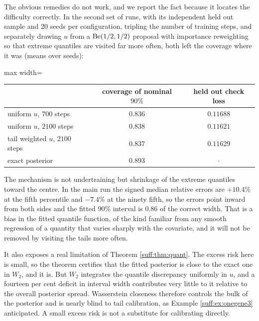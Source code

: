 The obvious remedies do not work, and we report the fact because it locates the difficulty
correctly. In the second set of runs, with its independent held out sample and $20$ seeds per
configuration, tripling the number of training steps, and separately drawing $u$ from a
$\mathrm{Be}(1/2,1/2)$ proposal with importance reweighting so that extreme quantiles are visited far
more often, both left the coverage where it was (means over seeds):

\begin{center}
\begin{adjustbox}{max width=\textwidth}
\begin{tabular}{lcc}
\toprule
& coverage of nominal $90\%$ & held out check loss \\
\midrule
uniform $u$, $700$ steps            & $0.836$ & $0.11688$ \\
uniform $u$, $2100$ steps           & $0.838$ & $0.11621$ \\
tail weighted $u$, $2100$ steps     & $0.837$ & $0.11629$ \\
exact posterior                     & $0.893$ & $\cdot$ \\
\bottomrule
\end{tabular}
\end{adjustbox}
\end{center}

The mechanism is not undertraining but shrinkage of the extreme quantiles toward the centre.
In the main run the signed median relative errors are $+10.4\%$ at the fifth percentile and
$-7.4\%$ at the ninety fifth, so the errors point inward from both sides and the fitted $90\%$
interval is $0.86$ of the correct width. That is a bias in the fitted quantile function, of
the kind familiar from any smooth regression of a quantity that varies sharply with the
covariate, and it will not be removed by visiting the tails more often.

It also exposes a real limitation of Theorem \ref{suff:thm:quant}. The excess risk here is
small, so the theorem certifies that the fitted posterior is close to the exact one in $W_2$,
and it is. But $W_2$ integrates the quantile discrepancy uniformly in $u$, and a fourteen per
cent deficit in interval width contributes very little to it relative to the overall
posterior spread. Wasserstein closeness therefore controls the bulk of the posterior and is
nearly blind to tail calibration, as Example \ref{suff:ex:onegene3} anticipated. A small excess
risk is not a substitute for calibrating directly.

